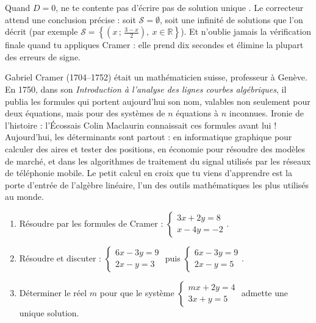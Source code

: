 \documentclass[11pt]{article}
\begin{document}
\begin{attention}
Quand $D=0$, ne te contente pas d'écrire \og pas de solution unique \fg. Le correcteur attend une conclusion précise : soit $\mathcal{S}=\emptyset$, soit une infinité de solutions que l'on décrit (par exemple $\mathcal{S}=\left\{\left(x\,;\,\tfrac{3-x}{2}\right),\ x\in\mathbb{R}\right\}$). Et n'oublie jamais la vérification finale quand tu appliques Cramer : elle prend dix secondes et élimine la plupart des erreurs de signe.
\end{attention}

\begin{savaistu}
Gabriel Cramer (1704--1752) était un mathématicien suisse, professeur à Genève. En 1750, dans son \emph{Introduction à l'analyse des lignes courbes algébriques}, il publia les formules qui portent aujourd'hui son nom, valables non seulement pour deux équations, mais pour des systèmes de $n$ équations à $n$ inconnues. Ironie de l'histoire : l'Écossais Colin Maclaurin connaissait ces formules avant lui ! Aujourd'hui, les déterminants sont partout : en informatique graphique pour calculer des aires et tester des positions, en économie pour résoudre des modèles de marché, et dans les algorithmes de traitement du signal utilisés par les réseaux de téléphonie mobile. Le petit calcul en croix que tu viens d'apprendre est la porte d'entrée de l'algèbre linéaire, l'un des outils mathématiques les plus utilisés au monde.
\end{savaistu}

\begin{exercice}
\begin{enumerate}
\item Résoudre par les formules de Cramer : $\begin{cases} 3x+2y=8 \\ x-4y=-2 \end{cases}$.
\item Résoudre et discuter : $\begin{cases} 6x-3y=9 \\ 2x-y=3 \end{cases}$ puis $\begin{cases} 6x-3y=9 \\ 2x-y=5 \end{cases}$.
\item Déterminer le réel $m$ pour que le système $\begin{cases} mx+2y=4 \\ 3x+y=5 \end{cases}$ admette une unique solution.
\end{enumerate}
\end{exercice}
\end{document}
